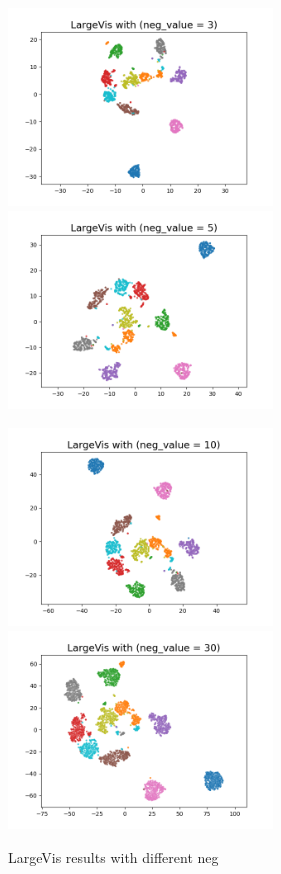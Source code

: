 \begin{figure}[H]
\centering  %
{
\label{Fig.sub.1}
\includegraphics[width=7cm,height=4cm\textwidth]{images/largevis/image_largevis_neg3.png}}
{
\label{Fig.sub.2}
\includegraphics[width=7cm,height=4cm\textwidth]{images/largevis/image_largevis_neg5.png}}

\centering  %
{
\label{Fig.sub.1}
\includegraphics[width=7cm,height=4cm\textwidth]{images/largevis/image_largevis_neg10.png}}
{
\label{Fig.sub.2}
\includegraphics[width=7cm,height=4cm\textwidth]{images/largevis/image_largevis_neg30.png}}
\caption{LargeVis results with different neg}
\end{figure}

